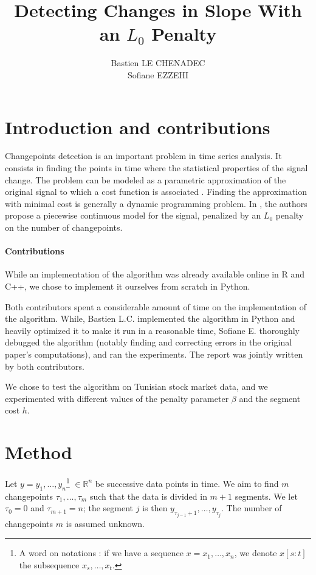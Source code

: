 \documentclass[11pt]{article}
\title{Detecting Changes in Slope With an $L_0$ Penalty}
\author{
Bastien LE CHENADEC \email{bastien.le-chenadec@eleves.enpc.fr} \\ %
Sofiane EZZEHI \email{sofiane.ezzehi@eleves.enpc.fr} %
}
\begin{document}
\maketitle
\section{Introduction and contributions}

Changepoints detection is an important problem in time series analysis. It consists in finding the points in time where the statistical properties of the signal change. The problem can be modeled as a parametric approximation of the original signal to which a cost function is associated \cite{Truong_Oudre_Vayatis_2020}. Finding the approximation with minimal cost is generally a dynamic programming problem. In \cite{main_article}, the authors propose a piecewise continuous model for the signal, penalized by an $L_0$ penalty on the number of changepoints.

\paragraph*{Contributions}
While an implementation of the algorithm was already available online in R and C++, we chose to implement it ourselves from scratch in Python.

Both contributors spent a considerable amount of time on the implementation of the algorithm. While, Bastien L.C. implemented the algorithm in Python and heavily optimized it to make it run in a reasonable time, Sofiane E. thoroughly debugged the algorithm (notably finding and correcting errors in the original paper's computations), and ran the experiments. The report was jointly written by both contributors.

 We chose to test the algorithm on Tunisian stock market data, and we experimented with different values of the penalty parameter $\beta$ and the segment cost $h$.

\section{Method}

Let $y=y_1, \dots, y_n$\footnote{A word on notations : if we have a sequence $x=x_1,\dots,x_n$, we denote $x[s:t]$ the subsequence $x_s,\dots,x_t$.} $\in \mathbb{R}^n$ be successive data points in time. We aim to find $m$ changepoints $\tau_1,\dots,\tau_m$ such that the data is divided in $m+1$ segments. We let $\tau_0=0$ and $\tau_{m+1}=n$; the segment $j$ is then $y_{\tau_{j-1}+1},\dots,y_{\tau_j}$. The number of changepoints $m$ is assumed unknown.
\end{document}
